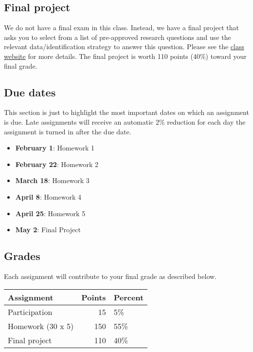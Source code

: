 \documentclass[11pt,]{article}
\providecommand{\tightlist}{%
  \setlength{\itemsep}{0pt}\setlength{\parskip}{0pt}}
\begin{document}
\hypertarget{final-project}{%
\subsection{Final project}\label{final-project}}

We do not have a final exam in this class. Instead, we have a final
project that asks you to select from a list of pre-approved research
questions and use the relevant data/identification strategy to answer
this question. Please see the
\href{https://econ470s22.classes.ianmccarthyecon.com/}{class website}
for more details. The final project is worth 110 points (40\%) toward
your final grade.

\hypertarget{due-dates}{%
\subsection{Due dates}\label{due-dates}}

This section is just to highlight the most important dates on which an
assignment is due. Late assignments will receive an automatic 2\%
reduction for each day the assignment is turned in after the due date.

\begin{itemize}
\tightlist
\item
  \textbf{February 1}: Homework 1
\item
  \textbf{February 22}: Homework 2
\item
  \textbf{March 18}: Homework 3
\item
  \textbf{April 8}: Homework 4
\item
  \textbf{April 25}: Homework 5
\item
  \textbf{May 2}: Final Project
\end{itemize}

\hypertarget{grades}{%
\subsection{Grades}\label{grades}}

Each assignment will contribute to your final grade as described below.

\begin{longtable}[]{@{}lrl@{}}
\toprule()
Assignment & Points & Percent \\
\midrule()
\endhead
Participation & 15 & 5\% \\
Homework (30 x 5) & 150 & 55\% \\
Final project & 110 & 40\% \\
\bottomrule()
\end{longtable}
\end{document}
